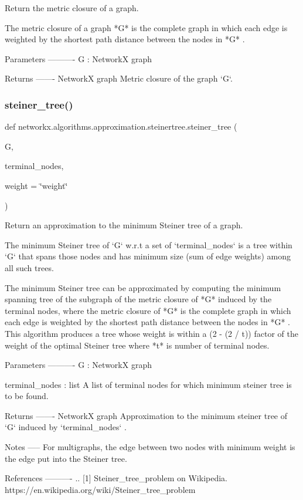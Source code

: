 \begin{DoxyVerb}Return the metric closure of a graph.

The metric closure of a graph *G* is the complete graph in which each edge
is weighted by the shortest path distance between the nodes in *G* .

Parameters
----------
G : NetworkX graph

Returns
-------
NetworkX graph
    Metric closure of the graph `G`.\end{DoxyVerb}
 \mbox{\label{namespacenetworkx_1_1algorithms_1_1approximation_1_1steinertree_a855a6b604c977181e6247a476b568391}} 
\subsubsection{\texorpdfstring{steiner\+\_\+tree()}{steiner\_tree()}}
{\footnotesize\ttfamily def networkx.\+algorithms.\+approximation.\+steinertree.\+steiner\+\_\+tree (\begin{DoxyParamCaption}\item[{}]{G,  }\item[{}]{terminal\+\_\+nodes,  }\item[{}]{weight = {\ttfamily \char`\"{}weight\char`\"{}} }\end{DoxyParamCaption})}

\begin{DoxyVerb}Return an approximation to the minimum Steiner tree of a graph.

The minimum Steiner tree of `G` w.r.t a set of `terminal_nodes`
is a tree within `G` that spans those nodes and has minimum size
(sum of edge weights) among all such trees.

The minimum Steiner tree can be approximated by computing the minimum
spanning tree of the subgraph of the metric closure of *G* induced by the
terminal nodes, where the metric closure of *G* is the complete graph in
which each edge is weighted by the shortest path distance between the
nodes in *G* .
This algorithm produces a tree whose weight is within a (2 - (2 / t))
factor of the weight of the optimal Steiner tree where *t* is number of
terminal nodes.

Parameters
----------
G : NetworkX graph

terminal_nodes : list
     A list of terminal nodes for which minimum steiner tree is
     to be found.

Returns
-------
NetworkX graph
    Approximation to the minimum steiner tree of `G` induced by
    `terminal_nodes` .

Notes
-----
For multigraphs, the edge between two nodes with minimum weight is the
edge put into the Steiner tree.


References
----------
.. [1] Steiner_tree_problem on Wikipedia.
   https://en.wikipedia.org/wiki/Steiner_tree_problem
\end{DoxyVerb}
 